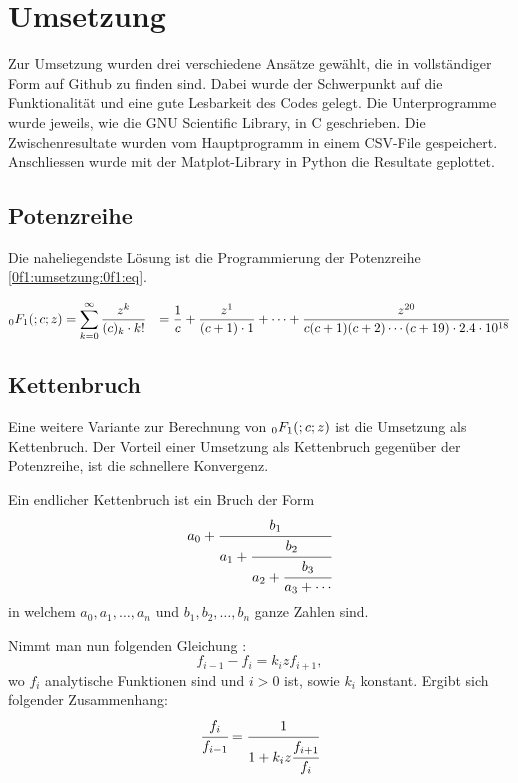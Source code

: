 %
%
%
\section{Umsetzung
\label{0f1:section:teil2}}
Zur Umsetzung wurden drei verschiedene Ansätze gewählt, die in vollständiger Form auf Github \cite{0f1:code} zu finden sind. Dabei wurde der Schwerpunkt auf die Funktionalität und eine gute Lesbarkeit des Codes gelegt.
Die Unterprogramme wurde jeweils, wie die GNU Scientific Library, in C geschrieben. Die Zwischenresultate wurden vom Hauptprogramm in einem CSV-File gespeichert. Anschliessen wurde mit der Matplot-Library in Python die Resultate geplottet.

\subsection{Potenzreihe
\label{0f1:subsection:potenzreihe}}
Die naheliegendste Lösung ist die Programmierung der Potenzreihe \eqref{0f1:umsetzung:0f1:eq}.

\begin{align}
    \label{0f1:umsetzung:0f1:eq}
    \mathstrut_0F_1(;c;z)
    &=
    \sum_{k=0}^\infty
    \frac{z^k}{(c)_k \cdot k!}
    &= 
    \frac{1}{c}
    +\frac{z^1}{(c+1) \cdot 1}
    + \cdots
    + \frac{z^{20}}{c(c+1)(c+2)\cdots(c+19) \cdot 2.4 \cdot 10^{18}}
\end{align}



\subsection{Kettenbruch
\label{0f1:subsection:kettenbruch}}
Eine weitere Variante zur Berechnung von $\mathstrut_0F_1(;c;z)$ ist die Umsetzung als Kettenbruch.
Der Vorteil einer Umsetzung als Kettenbruch gegenüber der Potenzreihe, ist die schnellere Konvergenz.

Ein endlicher Kettenbruch \cite{0f1:wiki-kettenbruch} ist ein Bruch der Form
\begin{equation*}
a_0 + \cfrac{b_1}{a_1+\cfrac{b_2}{a_2+\cfrac{b_3}{a_3+\cdots}}}
\end{equation*}
in welchem $a_0, a_1,\dots,a_n$ und $b_1,b_2,\dots,b_n$ ganze Zahlen sind.

Nimmt man nun folgenden Gleichung \cite{0f1:wiki-fraction}:
\begin{equation*}
	f_{i-1} - f_i = k_i z f_{i+1},
\end{equation*}
wo $f_i$ analytische Funktionen sind und $i > 0$ ist, sowie $k_i$ konstant.
Ergibt sich folgender Zusammenhang:
\begin{equation*}
	\cfrac{f_i}{f_{i-1}} = \cfrac{1}{1+k_iz\cfrac{f_{i+1}}{f_i}}
\end{equation*}

